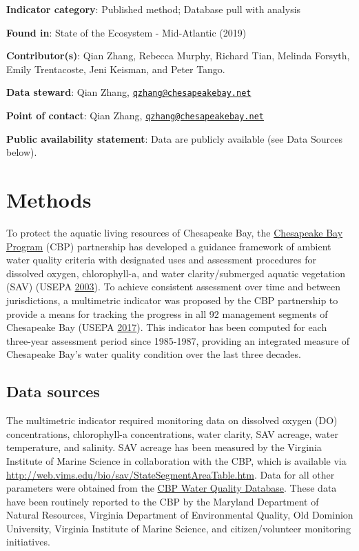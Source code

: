 \documentclass[
]{book}
\begin{document}
\textbf{Indicator category}: Published method; Database pull with analysis

\textbf{Found in}: State of the Ecosystem - Mid-Atlantic (2019)

\textbf{Contributor(s)}: Qian Zhang, Rebecca Murphy, Richard Tian, Melinda Forsyth, Emily Trentacoste, Jeni Keisman, and Peter Tango.

\textbf{Data steward}: Qian Zhang, \href{mailto:qzhang@chesapeakebay.net}{\nolinkurl{qzhang@chesapeakebay.net}}

\textbf{Point of contact}: Qian Zhang, \href{mailto:qzhang@chesapeakebay.net}{\nolinkurl{qzhang@chesapeakebay.net}}

\textbf{Public availability statement}: Data are publicly available (see Data Sources below).

\hypertarget{methods-7}{%
\section{Methods}\label{methods-7}}

To protect the aquatic living resources of Chesapeake Bay, the \href{https://www.chesapeakebay.net/}{Chesapeake Bay Program} (CBP) partnership has developed a guidance framework of ambient water quality criteria with designated uses and assessment procedures for dissolved oxygen, chlorophyll-a, and water clarity/submerged aquatic vegetation (SAV) (USEPA \protect\hyperlink{ref-usepa2003}{2003}). To achieve consistent assessment over time and between jurisdictions, a multimetric indicator was proposed by the CBP partnership to provide a means for tracking the progress in all 92 management segments of Chesapeake Bay (USEPA \protect\hyperlink{ref-usepa2017}{2017}). This indicator has been computed for each three-year assessment period since 1985-1987, providing an integrated measure of Chesapeake Bay's water quality condition over the last three decades.

\hypertarget{data-sources-7}{%
\subsection{Data sources}\label{data-sources-7}}

The multimetric indicator required monitoring data on dissolved oxygen (DO) concentrations, chlorophyll-a concentrations, water clarity, SAV acreage, water temperature, and salinity. SAV acreage has been measured by the Virginia Institute of Marine Science in collaboration with the CBP, which is available via \url{http://web.vims.edu/bio/sav/StateSegmentAreaTable.htm}. Data for all other parameters were obtained from the \href{http://www.chesapeakebay.net/data/downloads/cbp_water_quality_database_1984_present}{CBP Water Quality Database}. These data have been routinely reported to the CBP by the Maryland Department of Natural Resources, Virginia Department of Environmental Quality, Old Dominion University, Virginia Institute of Marine Science, and citizen/volunteer monitoring initiatives.
\end{document}
